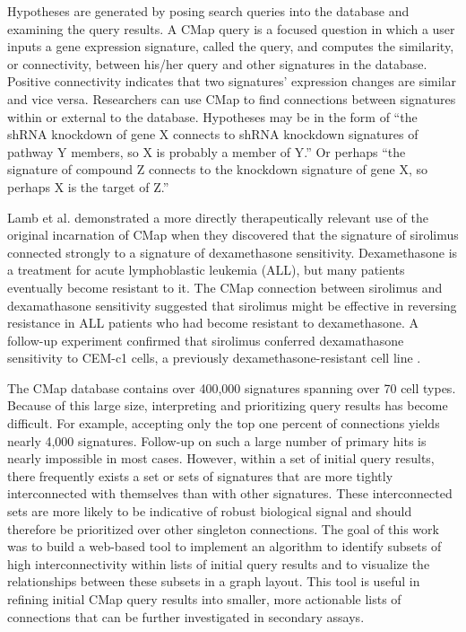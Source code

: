 \documentclass[12pt]{article}
\begin{document}
Hypotheses are generated by posing search queries into the database and examining the query results. A CMap query is a focused question in which a user inputs a gene expression signature, called the query, and computes the similarity, or connectivity, between his/her query and other signatures in the database. Positive connectivity indicates that two signatures' expression changes are similar and vice versa. Researchers can use CMap to find connections between signatures within or external to the database. Hypotheses may be in the form of ``the shRNA knockdown of gene X connects to shRNA knockdown signatures of pathway Y members, so X is probably a member of Y.'' Or perhaps ``the signature of compound Z connects to the knockdown signature of gene X, so perhaps X is the target of Z.''

Lamb et al. demonstrated a more directly therapeutically relevant use of the original incarnation of CMap when they discovered that the signature of sirolimus connected strongly to a signature of dexamethasone sensitivity. Dexamethasone is a treatment for acute lymphoblastic leukemia (ALL), but many patients eventually become resistant to it\cite{tissing_molecular_2003}. The CMap connection between sirolimus and dexamathasone sensitivity suggested that sirolimus might be effective in reversing resistance in ALL patients who had become resistant to dexamethasone. A follow-up experiment confirmed that sirolimus conferred dexamathasone sensitivity to CEM-c1 cells, a previously dexamethasone-resistant cell line \cite{lamb_connectivity_2006}. 

The CMap database contains over 400,000 signatures spanning over 70 cell types. Because of this large size, interpreting and prioritizing query results has become difficult. For example, accepting only the top one percent of connections yields nearly 4,000 signatures. Follow-up on such a large number of primary hits is nearly impossible in most cases. However, within a set of initial query results, there frequently exists a set or sets of signatures that are more tightly interconnected with themselves than with other signatures. These interconnected sets are more likely to be indicative of robust biological signal and should therefore be prioritized over other singleton connections. The goal of this work was to build a web-based tool to implement an algorithm to identify subsets of high interconnectivity within lists of initial query results and to visualize the relationships between these subsets in a graph layout. This tool is useful in refining initial CMap query results into smaller, more actionable lists of connections that can be further investigated in secondary assays.
\end{document}
